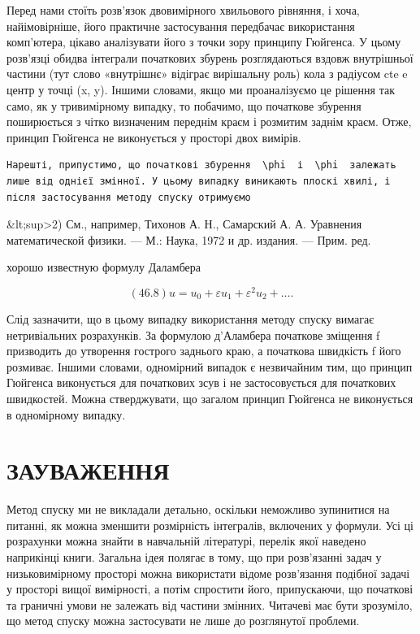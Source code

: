 \documentclass[
  ukrainian,
]{article}
\begin{document}
Перед нами стоїть розв'язок двовимірного хвильового рівняння, і хоча,
найімовірніше, його практичне застосування передбачає використання
комп'ютера, цікаво аналізувати його з точки зору принципу Гюйгенса. У
цьому розв'язці обидва інтеграли початкових збурень розглядаються вздовж
внутрішньої частини (тут слово «внутрішнє» відіграє вирішальну роль)
кола з радіусом cte e центр у точці (x, y). Іншими словами, якщо ми
проаналізуємо це рішення так само, як у тривимірному випадку, то
побачимо, що початкове збурення поширюється з чітко визначеним переднім
краєм і розмитим заднім краєм. Отже, принцип Гюйгенса не виконується у
просторі двох вимірів.

\begin{verbatim}
Нарешті, припустимо, що початкові збурення  \phi  і  \phi  залежать лише від однієї змінної. У цьому випадку виникають плоскі хвилі, і після застосування методу спуску отримуємо
\end{verbatim}

\&lt;sup\textgreater2) См., например, Тихонов А. Н., Самарский А. А.
Уравнения математической физики. --- М.: Наука, 1972 и др. издания. ---
Прим. ред.

хорошо известную формулу Даламбера

\[
(46.8) u = u_0 + \varepsilon u_1 + \varepsilon^2 u_2 + \dots.
\]

Слід зазначити, що в цьому випадку використання методу спуску вимагає
нетривіальних розрахунків. За формулою д'Аламбера початкове зміщення f
призводить до утворення гострого заднього краю, а початкова швидкість f
його розмиває. Іншими словами, одномірний випадок є незвичайним тим, що
принцип Гюйгенса виконується для початкових зсув і не застосовується для
початкових швидкостей. Можна стверджувати, що загалом принцип Гюйгенса
не виконується в одномірному випадку.

\section{ЗАУВАЖЕННЯ}\label{ux437ux430ux443ux432ux430ux436ux435ux43dux43dux44f-9}

Метод спуску ми не викладали детально, оскільки неможливо зупинитися на
питанні, як можна зменшити розмірність інтегралів, включених у формули.
Усі ці розрахунки можна знайти в навчальній літературі, перелік якої
наведено наприкінці книги. Загальна ідея полягає в тому, що при
розв'язанні задач у низьковимірному просторі можна використати відоме
розв'язання подібної задачі у просторі вищої вимірності, а потім
спростити його, припускаючи, що початкові та граничні умови не залежать
від частини змінних. Читачеві має бути зрозуміло, що метод спуску можна
застосувати не лише до розглянутої проблеми.
\end{document}
